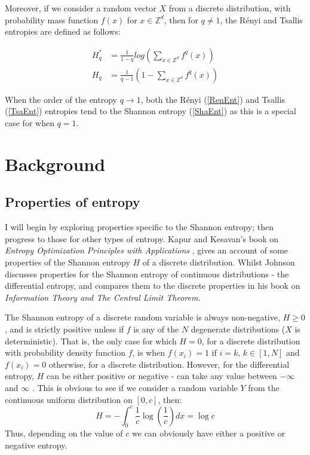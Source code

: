 \documentclass[12pt]{report}
\begin{document}
Moreover, if we consider a random vector $X$ from a discrete distribution, with probability mass function $f(x)$ for $x \in \mathbb{Z}^d$, then for $q \neq 1$, the R\'enyi and Tsallis entropies are defined as follows:

\begin{align*}
H_{q}^{*} &=  \frac{1}{1-q} log \left( \sum_{x \in \mathbb{Z}^{d}} f^q (x) \right) \\
H_{q} &=  \frac{1}{q-1} \left(1 - \sum_{x \in \mathbb{Z}^d} f^q (x) \right)  
\end{align*}

When the order of the entropy $q \to 1$, both the R\'enyi (\ref{RenEnt}) and Tsallis (\ref{TsaEnt}) entropies tend to the Shannon entropy (\ref{ShaEnt}) as this is a special case for when $q=1$. 



\section{Background}


\subsection{Properties of entropy} \label{entropyProperties}

I will begin by exploring properties specific to the Shannon entropy; then progress to those for other types of entropy. Kapur and Kesavan's book on \textit{Entropy Optimization Principles with Applications} \cite{paper8}, gives an account of some properties of the Shannon entropy $H$ of a discrete distribution. Whilst Johnson \cite{book1} discusses properties for the Shannon entropy of continuous distributions - the differential entropy, and compares them to the discrete properties in his book on \textit{Information Theory and The Central Limit Theorem}.

The Shannon entropy of a discrete random variable is always non-negative, $H \geq 0$, and is strictly positive unless if $f$ is any of the $N$ degenerate distributions ($X$ is deterministic). That is, the only case for which $H=0$, for a discrete distribution with probability density function $f$, is when $f(x_{i}) = 1$ if $i = k$, $k \in [1, N]$ and $f(x_{i}) = 0$ otherwise, for a discrete distribution. However, for the differential entropy, $H$ can be either positive or negative - can take any value between $-\infty$ and $\infty$ \cite{book2}. This is obvious to see if we consider a random variable $Y$ from the continuous uniform distribution on $[0, c]$, then:
\begin{equation}
H = - \int_{0}^{c} \frac{1}{c} \log \left( \frac{1}{c} \right) dx = \log c \nonumber
\end{equation}
Thus, depending on the value of $c$ we can obviously have either a positive or negative entropy.
\end{document}
